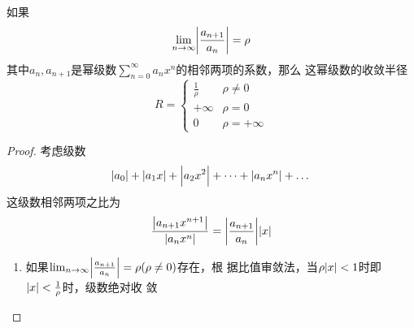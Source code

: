\documentclass[11pt]{article}
\begin{document}
\begin{theorem}[]
如果
\begin{equation*}
\lim_{n\to\infty}\abs{\frac{a_{n+1}}{a_n}}=\rho
\end{equation*}
其中\(a_n,a_{n+1}\)是幂级数\(\sum_{n=0}^\infty a_nx^n\)的相邻两项的系数，那么
这幂级数的收敛半径
\begin{equation*}
R=
\begin{cases}
\frac{1}{\rho}&\rho\neq0\\
+\infty&\rho=0\\
0&\rho=+\infty
\end{cases}
\end{equation*}
\end{theorem}

\begin{proof}
考虑级数
\begin{equation*}
\abs{a_0}+\abs{a_1x}+\abs{a_2x^2}+\dots+\abs{a_nx^n}+\dots
\end{equation*}
这级数相邻两项之比为
\begin{equation*}
\frac{\abs{a_{n+1}x^{n+1}}}{\abs{a_nx^n}}=\abs{\frac{a_{n+1}}{a_n}}\abs{x}
\end{equation*}

\begin{enumerate}
\item 如果\(\lim_{n\to\infty}\abs{\frac{a_{n+1}}{a_n}}=\rho(\rho\neq0)\)存在，根
据比值审敛法，当\(\rho\abs{x}<1\)时即\(\abs{x}<\frac{1}{\rho}\)时，级数绝对收
敛
\end{enumerate}
\end{proof}
\end{document}
